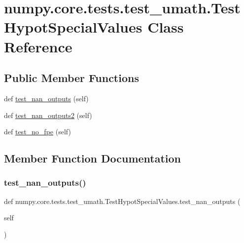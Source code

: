 \hypertarget{classnumpy_1_1core_1_1tests_1_1test__umath_1_1TestHypotSpecialValues}{}\section{numpy.\+core.\+tests.\+test\+\_\+umath.\+Test\+Hypot\+Special\+Values Class Reference}
\label{classnumpy_1_1core_1_1tests_1_1test__umath_1_1TestHypotSpecialValues}
\subsection*{Public Member Functions}
\begin{DoxyCompactItemize}
\item 
def \hyperlink{classnumpy_1_1core_1_1tests_1_1test__umath_1_1TestHypotSpecialValues_a27548965b3ff2b744bd8ac1003c813f4}{test\+\_\+nan\+\_\+outputs} (self)
\item 
def \hyperlink{classnumpy_1_1core_1_1tests_1_1test__umath_1_1TestHypotSpecialValues_a61e1aeb9b405473d6c86aa392ee15ce6}{test\+\_\+nan\+\_\+outputs2} (self)
\item 
def \hyperlink{classnumpy_1_1core_1_1tests_1_1test__umath_1_1TestHypotSpecialValues_af17ce0df2f2a71e7ed6586f7ae003506}{test\+\_\+no\+\_\+fpe} (self)
\end{DoxyCompactItemize}


\subsection{Member Function Documentation}
\mbox{\label{classnumpy_1_1core_1_1tests_1_1test__umath_1_1TestHypotSpecialValues_a27548965b3ff2b744bd8ac1003c813f4}} 
\subsubsection{\texorpdfstring{test\+\_\+nan\+\_\+outputs()}{test\_nan\_outputs()}}
{\footnotesize\ttfamily def numpy.\+core.\+tests.\+test\+\_\+umath.\+Test\+Hypot\+Special\+Values.\+test\+\_\+nan\+\_\+outputs (\begin{DoxyParamCaption}\item[{}]{self }\end{DoxyParamCaption})}

